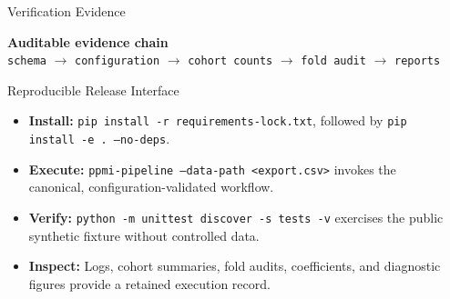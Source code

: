 \begin{frame}[t]
\begin{columns}[t]
\begin{column}{\colwidth}
\begin{block}{Verification Evidence}
\begin{center}
{\fontsize{19}{24}\selectfont
\textbf{Auditable evidence chain}\\[0.22cm]
\texttt{schema} $\rightarrow$
\texttt{configuration} $\rightarrow$
\texttt{cohort counts} $\rightarrow$
\texttt{fold audit} $\rightarrow$
\texttt{reports}
}
\end{center}

\end{block}

\vspace{1cm}

\begin{block}{Reproducible Release Interface}
\begin{itemize}
  \setlength{\itemsep}{0.34em}
  \item \textbf{Install:} \texttt{pip install -r requirements-lock.txt}, followed by \texttt{pip install -e . --no-deps}.
  \item \textbf{Execute:} \texttt{ppmi-pipeline --data-path <export.csv>} invokes the canonical, configuration-validated workflow.
  \item \textbf{Verify:} \texttt{python -m unittest discover -s tests -v} exercises the public synthetic fixture without controlled data.
  \item \textbf{Inspect:} Logs, cohort summaries, fold audits, coefficients, and diagnostic figures provide a retained execution record.
\end{itemize}
\end{block}

\end{column}

\separatorcolumn

\begin{column}{\colwidth}


\end{column}
\end{columns}
\end{frame}
